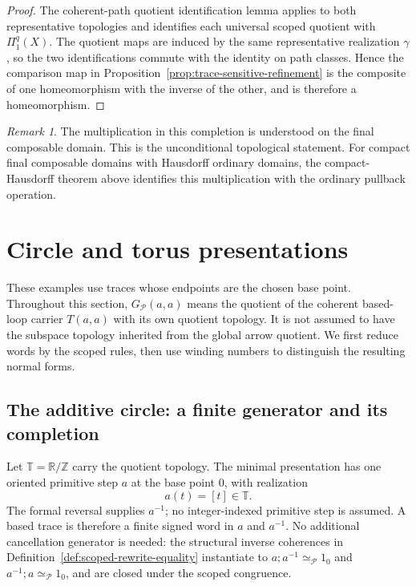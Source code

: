 \documentclass[10pt,reqno]{amsart}
\theoremstyle{definition}
\theoremstyle{plain}
\theoremstyle{remark}
\newtheorem{remark}[definition]{Remark}
\newcommand{\RwEq}{\mathrel{\simeq_{\!\mathcal P}}}
\begin{document}
\begin{proof}
The coherent-path quotient identification lemma applies to both representative
topologies and identifies each universal scoped quotient with
$\Pi_1^q(X)$.  The quotient maps are induced by the same representative
realization $\gamma$, so the two identifications commute with the identity on
path classes.  Hence the comparison map in
Proposition~\ref{prop:trace-sensitive-refinement}
is the composite of one homeomorphism with the inverse of the other, and is
therefore a homeomorphism.
\end{proof}



\begin{remark}
The multiplication in this completion is understood on the final composable
domain.  This is the unconditional topological statement.  For compact final
composable domains with Hausdorff ordinary domains, the compact-Hausdorff
theorem above identifies this multiplication with the ordinary pullback
operation.
\end{remark}

\section{Circle and torus presentations}
\label{sec:circle-torus}

These examples use traces whose endpoints are the chosen base point.
Throughout this section, $G_{\mathcal P}(a,a)$ means the quotient of the
coherent based-loop carrier $T(a,a)$ with its own quotient topology.
It is not assumed to have the subspace topology inherited from the global
arrow quotient.  We first reduce words by the scoped rules, then use
winding numbers to distinguish the resulting normal forms.

\subsection{The additive circle: a finite generator and its completion}

Let $\mathbb T=\mathbb R/\mathbb Z$ carry the quotient topology.  The minimal
presentation has one oriented primitive step $a$ at the base point $0$, with
realization
\[
  a(t)=[t]\in\mathbb T.
\]
The formal reversal supplies $a^{-1}$; no integer-indexed primitive step is
assumed.  A based trace is therefore a finite signed word in $a$ and
$a^{-1}$.  No additional cancellation generator is needed: the structural
inverse coherences in Definition~\ref{def:scoped-rewrite-equality} instantiate to
\(a;a^{-1}\RwEq1_0\) and \(a^{-1};a\RwEq1_0\), and are closed under the
scoped congruence.
\end{document}
